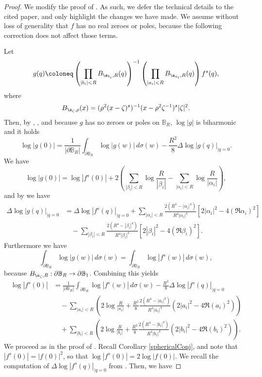 \documentclass{amsart}
\begin{document}
\begin{proof}
    We modify the proof of \cite[Theorem 3.3]{Altavilla_2019}. As such, we defer the technical details to the cited paper, and only highlight the changes we have made. We assume without loss of generality that $f$ has no real zeroes or poles, because the following correction does not affect those terms. 

    Let \[g(q)\coloneq \left(\prod_{|b_i|< R}B_{\s_{b_i},R}(q)\right)^{-1}\left(\prod_{|a_i|< R}B_{\s_{a_i},R}(q)\right)f^s(q),\] where \[B_{\s_\zeta, \rho}(x)=(\rho^2(x-\zeta)^s)^{-1}(x-\rho^2\zeta^{-1})^s|\zeta|^2.\] Then, by \cite[Theorem 7.24]{mitrea2013}, \cite[Theorem 2.10]{Altavilla_2019}, and because $g$ has no zeroes or poles on $\mathbb B_R$, $\log|g|$ is biharmonic and it holds \[\log|g(0)|=\frac{1}{|\partial \mathbb B_R|}\int_{\partial \mathbb B_R}\log|g(w)|\,d\sigma(w)-\frac{R^2}{8}\Delta\log|g(q)|_{\mid q=0}.\] We have \[\log|g(0)|=\log|f^s(0)|+2\left(\sum_{|\beta_i|<R}\log\frac{R}{|\beta_i|}-\sum_{|\alpha_i|<R}\log\frac{R}{|\alpha_i|}\right),\] and by \cite[Lemma 3.1]{Altavilla_2019} we have \begin{align*}\Delta\log|g(q)|_{|q=0}&=\Delta\log|f^s(q)|_{|q=0}+\sum_{|\alpha_i|<R}\frac{2(R^4-|\alpha_i|^4)}{R^4|\alpha_i|^4}[2|\alpha_i|^2-4(\Re \alpha_i)^2]\\
    &\quad-\sum_{|\beta_i|<R}\frac{2(R^4-|\beta_i|^4)}{R^4|\beta_i|^4}[2|\beta_i|^2-4(\Re \beta_i)^2].\end{align*} Furthermore we have \[\int_{\partial \mathbb B_R}\log|g(w)|\,d\sigma(w)=\int_{\partial \mathbb B_R}\log|f^s(w)|\,d\sigma(w),\] because $B_{\s_\zeta,R}:\partial \mathbb B_R\to\partial \mathbb B_1$. Combining this yields \begin{align*}\log|f^s(0)|&=\frac{1}{|\partial \mathbb B_R|}\int_{\partial \mathbb B_R}\log|f^s(w)|\,d\sigma (w)-\frac{R^2}{8}\Delta\log|f^s(q)|_{\mid q=0}\\ 
    &\quad-\sum_{|a_i|<R}\left(2\log\frac{R}{|a_i|}+\frac{R^2}{8}\frac{2(R^4-|a_i|^4)}{R^4|a_i|^4}\left(2|a_i|^2-4\Re(a_i)^2\right)\right)\\
    &\quad+\sum_{|b_i|<R}\left(2\log\frac{R}{|b_i|}+\frac{R^2}{8}\frac{2(R^4-|b_i|^4)}{R^4|b_i|^4}\left(2|b_i|^2-4\Re(b_i)^2\right)\right).\end{align*} We proceed as in the proof of \cite[Theorem 13]{perottiJensen2019}. Recall Corollary \ref{sphericalConj}, and note that $|f^s(0)|=|f(0)|^2$, so that $\log|f^s(0)|=2\log|f(0)|$. We recall the computation of $\Delta\log|f^s(q)|_{\mid q=0}$ from \cite[Proposition 8]{Altavilla_2019}. Then, we have  

\end{proof}
\end{document}
